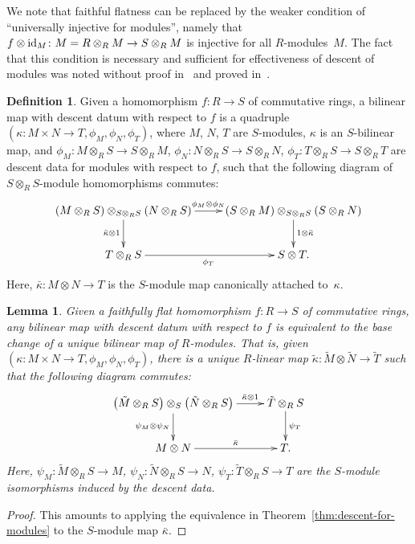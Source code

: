 \documentclass[pdftex]{sigma}
\newtheorem{lem}[thm]{Lemma}
\theoremstyle{definition}
\newtheorem{defn}[thm]{Definition}
\begin{document}
We note that faithful flatness can be replaced by the weaker condition of ``universally injective for modules'', namely that $f \otimes {\rm id}_M\colon M = R \otimes_{R} M \to S \otimes_{R} M$ is injective for all $R$-modules~$M$. The fact that this condition is necessary and sufficient for effectiveness of descent of modules was noted without proof in~\cite{O70} and proved in~\cite{M00}.

\begin{defn}Given a homomorphism $f\colon R \to S$ of commutative rings, a bilinear map with descent datum with respect to $f$ is a quadruple $(\kappa\colon M \times N \to T, \phi_M, \phi_N, \phi_T)$, where $M$, $N$, $T$ are $S$-modules, $\kappa$ is an $S$-bilinear map, and $\phi_M\colon M \otimes_{R} S \to S \otimes_{R} M$, $\phi_N\colon N \otimes_{R} S \to S \otimes_{R} N$, $\phi_T\colon T \otimes_{R} S \to S \otimes_{R} T$ are descent data for modules with respect to $f$, such that the following diagram of $S \otimes_{R} S$-module homomorphisms commutes:
\begin{gather*} \xymatrix{ (M \otimes_{R} S)\otimes_{S \otimes_{R} S} (N \otimes_{R} S) \ar[r]^{\phi_M \otimes \phi_N} \ar[d]_{\bar{\kappa} \otimes 1} & (S \otimes_{R} M) \otimes_{S \otimes_{R} S} (S \otimes_{R} N) \ar[d]^{1 \otimes \bar{\kappa}} \\ T \otimes_{R} S \ar[r]_{\phi_T} & S \otimes T. } \end{gather*}
Here, $\bar{\kappa}\colon M \otimes N \to T$ is the $S$-module map canonically attached to~$\kappa$.
\end{defn}

\begin{lem} \label{lem:descent-for-bilinear-maps}
Given a faithfully flat homomorphism $f\colon R \to S$ of commutative rings, any bi\-li\-near map with descent datum with respect to $f$ is equivalent to the base change of a unique bilinear map of $R$-modules. That is, given $(\kappa\colon M \times N \to T, \phi_M, \phi_N, \phi_T)$, there is a unique $R$-linear map $\tilde{\kappa}\colon \tilde{M} \otimes \tilde{N} \to \tilde{T}$ such that the following diagram commutes:
\begin{gather*} \xymatrix{ \big(\tilde{M} \otimes_{R} S\big) \otimes_S \big(\tilde{N} \otimes_{R} S\big) \ar[r]^-{\tilde{\kappa} \otimes 1} \ar[d]_{\psi_M \otimes \psi_N} & \tilde{T} \otimes_{R} S \ar[d]^{\psi_T} \\
M \otimes N \ar[r]^-{\bar{\kappa}} & T. } \end{gather*}
Here, $\psi_M\colon \tilde{M} \otimes_{R} S \to M$, $\psi_N\colon \tilde{N} \otimes_{R} S \to N$, $\psi_T\colon \tilde{T} \otimes_{R} S \to T$ are the $S$-module isomorphisms induced by the descent data.
\end{lem}
\begin{proof}This amounts to applying the equivalence in Theorem~\ref{thm:descent-for-modules} to the $S$-module map $\bar{\kappa}$.
\end{proof}
\end{document}
